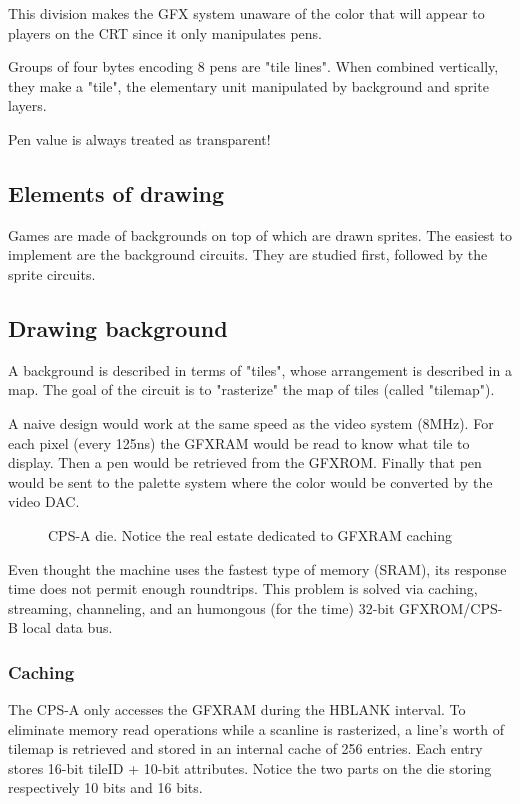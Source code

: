 This division makes the GFX system unaware of the color that will appear to players on the CRT since it only manipulates pens.




Groups of four bytes encoding 8 pens are "tile lines". When combined vertically, they make a "tile", the elementary unit manipulated by background and sprite layers.


 \begin{trivia}
 Pen value  is always treated as transparent!
 \end{trivia}



\subsection{Elements of drawing}

Games are made of backgrounds on top of which are drawn sprites. The easiest to implement are the background circuits. They are studied first, followed by the sprite circuits.

\subsection{Drawing background}

A background is described in terms of "tiles", whose arrangement is described in a map. The goal of the circuit is to "rasterize" the map of tiles (called "tilemap").

A naive design would work at the same speed as the video system (8MHz). For each pixel (every 125ns) the GFXRAM would be read to know what tile to display. Then a pen would be retrieved from the GFXROM. Finally that pen would be sent to the palette system where the color would be converted by the video DAC.

 \begin{figure}[H]%
 \caption*{CPS-A die. Notice the real estate dedicated to GFXRAM caching}%
 \end{figure}%

 Even thought the machine uses the fastest type of memory (SRAM), its response time does not permit enough roundtrips. This problem is solved via caching, streaming, channeling, and an humongous (for the time) 32-bit GFXROM/CPS-B local data bus. 


\subsubsection{Caching}
The CPS-A only accesses the GFXRAM during the HBLANK interval. To eliminate memory read operations while a scanline is rasterized, a line's worth of tilemap is retrieved and stored in an internal cache of 256 entries. Each entry stores 16-bit  tileID + 10-bit attributes. Notice the two parts on the die storing respectively 10 bits and 16 bits.





